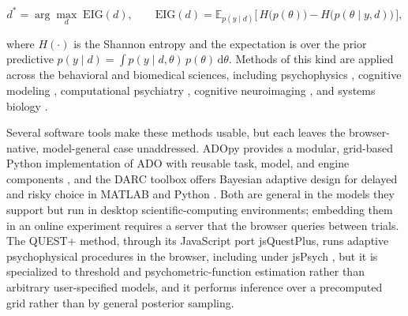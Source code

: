 %
\begin{equation}
d^{*} = \arg\max_{d}\; \mathrm{EIG}(d),
\qquad
\mathrm{EIG}(d)
  = \mathbb{E}_{p(y \mid d)}\!\Big[\, H\big(p(\theta)\big) - H\big(p(\theta \mid y, d)\big) \,\Big],
\label{eq:eig}
\end{equation}
%

where $H(\cdot)$ is the Shannon entropy and the expectation is over the prior predictive $p(y \mid d) = \int p(y \mid d, \theta)\,p(\theta)\,\mathrm{d}\theta$.
Methods of this kind are applied across the behavioral and biomedical sciences, including psychophysics \citep{watson2017questplus}, cognitive modeling \citep{myung2013tutorial}, computational psychiatry \citep{kwon2023adaptive}, cognitive neuroimaging \citep{bahg2020real}, and systems biology \citep{pauwels2014bayesian}.

Several software tools make these methods usable, but each leaves the browser-native, model-general case unaddressed.
ADOpy provides a modular, grid-based Python implementation of ADO with reusable task, model, and engine components \citep{yang2021adopy}, and the DARC toolbox offers Bayesian adaptive design for delayed and risky choice in MATLAB and Python \citep{vincent2017darc}.
Both are general in the models they support but run in desktop scientific-computing environments; embedding them in an online experiment requires a server that the browser queries between trials.
The QUEST+ method, through its JavaScript port jsQuestPlus, runs adaptive psychophysical procedures in the browser, including under jsPsych \citep{watson2017questplus,kuroki2022jsquestplus}, but it is specialized to threshold and psychometric-function estimation rather than arbitrary user-specified models, and it performs inference over a precomputed grid rather than by general posterior sampling.

